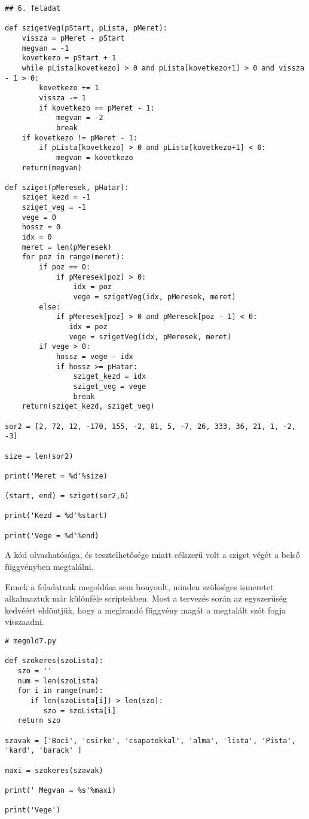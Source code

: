 \begin{Verbatim}[fontsize=\small]
## 6. feladat

def szigetVeg(pStart, pLista, pMeret):
    vissza = pMeret - pStart 
    megvan = -1
    kovetkezo = pStart + 1
    while pLista[kovetkezo] > 0 and pLista[kovetkezo+1] > 0 and vissza - 1 > 0:
        kovetkezo += 1
        vissza -= 1
        if kovetkezo == pMeret - 1:
            megvan = -2
            break
    if kovetkezo != pMeret - 1:
        if pLista[kovetkezo] > 0 and pLista[kovetkezo+1] < 0:
            megvan = kovetkezo
    return(megvan)

def sziget(pMeresek, pHatar):
    sziget_kezd = -1
    sziget_veg = -1
    vege = 0
    hossz = 0
    idx = 0
    meret = len(pMeresek)
    for poz in range(meret):
        if poz == 0:
            if pMeresek[poz] > 0:
                idx = poz
                vege = szigetVeg(idx, pMeresek, meret)
        else:
            if pMeresek[poz] > 0 and pMeresek[poz - 1] < 0:
               idx = poz
               vege = szigetVeg(idx, pMeresek, meret)
        if vege > 0:
            hossz = vege - idx
            if hossz >= pHatar:
                sziget_kezd = idx
                sziget_veg = vege
                break
    return(sziget_kezd, sziget_veg)

sor2 = [2, 72, 12, -170, 155, -2, 81, 5, -7, 26, 333, 36, 21, 1, -2, -3]

size = len(sor2)

print('Meret = %d'%size)

(start, end) = sziget(sor2,6)

print('Kezd = %d'%start)

print('Vege = %d'%end)

\end{Verbatim}

A k\'od olvashat\'os\'aga, \'es tesztelhet\H{o}s\'ege miatt c\'elszer\H{u} volt a sziget v\'eg\'et a 
bels\H{o} f\"uggv\'enyben megtal\'alni.

\themegold

Ennek a feladatnak megold\'asa sem bonyoult, minden sz\"uks\'eges ismeretet alkalmaztuk m\'ar k\"ul\"onf\'ele 
scriptekben. Most a tervez\'es sor\'an az egyszer\H{u}s\'eg kedv\'e\'ert eld\"ontj\"uk, hogy a meg\'{\i}rand\'o 
f\"uggv\'eny mag\'at a megtal\'alt sz\'ot fogja visszaadni.

\begin{Verbatim}[fontsize=\small]
# megold7.py

def szokeres(szoLista):
   szo = ''
   num = len(szoLista)
   for i in range(num):
      if len(szoLista[i]) > len(szo):
         szo = szoLista[i]
   return szo

szavak = ['Boci', 'csirke', 'csapatokkal', 'alma', 'lista', 'Pista', 'kard', 'barack' ]

maxi = szokeres(szavak)

print(' Megvan = %s'%maxi)

print('Vege')  
\end{Verbatim}

